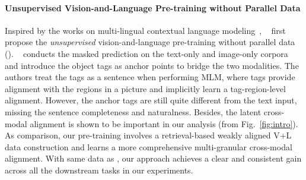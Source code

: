 \paragraph{Unsupervised Vision-and-Language Pre-training without Parallel Data}
Inspired by the works on multi-lingual contextual language modeling~\cite{conneau2019unsupervised,lample2018phrase,lample2017unsupervised, conneau2017word}, \uvisualbert~\cite{li2020unsupervised} first propose the \textit{unsupervised} vision-and-language pre-training without parallel data (\TaskName). 
\uvisualbert~\cite{li2020unsupervised} conducts the masked prediction on the text-only and image-only corpora and introduce the object tags as anchor points to bridge the two modalities.
The authors treat the tags as a sentence when performing MLM, where tags provide alignment with the regions in a picture and implicitly learn a tag-region-level alignment.
However, the anchor tags are still quite different from the text input, missing the sentence completeness and naturalness.
Besides, the latent cross-modal alignment is shown to be important in our analysis (from Fig.~\ref{fig:intro}).
As comparison, our pre-training involves a retrieval-based weakly aligned V+L data construction and learns a more comprehensive multi-granular cross-modal alignment.
With same data as \uvisualbert, our approach achieves a clear and consistent gain across all the downstream tasks in our experiments.


